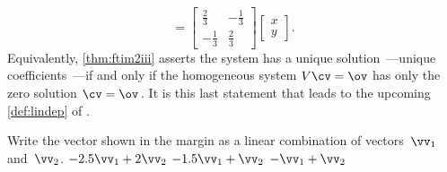 \begin{example}
\begin{solution}
\begin{equation*}
=\begin{bmatrix} \frac23&-\frac13\\-\frac13&\frac23 \end{bmatrix}
\begin{bmatrix} x\\y \end{bmatrix}.
\end{equation*}
Equivalently, \autoref{thm:ftim2iii} asserts the system has a unique solution~\cv---unique coefficients~\cv---if and only if the {homogeneous} system \(V\cv=\ov\) has only the zero solution \(\cv=\ov\)\,.
It is this last statement that leads to the upcoming \autoref{def:lindep} of .
\end{solution}
\end{example}



\begin{activity}
Write the vector shown in the margin as a linear combination of vectors~\(\vv_1\) and~\(\vv_2\).
{\(-2.5\vv_1 +2\vv_2\)}
{\(-1.5\vv_1 +\vv_2\)}
{\(-\vv_1 +\vv_2\)}
\end{activity}









